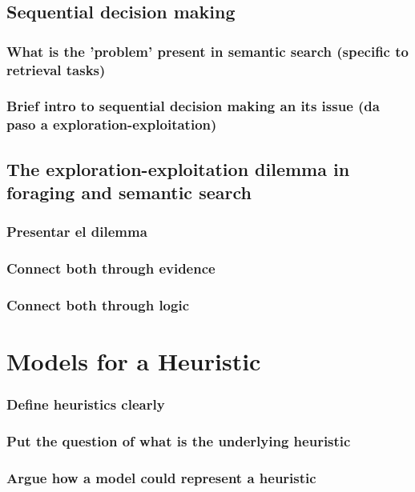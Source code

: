 \documentclass[11pt]{article}
\begin{document}
\subsection{Sequential decision making}
\label{sec:org7185ddf}
\subsubsection{What is the 'problem' present in semantic search (specific to retrieval tasks)}
\label{sec:org7029d48}
\subsubsection{Brief intro to sequential decision making an its issue (da paso a exploration-exploitation)}
\label{sec:orgdc55109}
\subsection{The exploration-exploitation dilemma in foraging and semantic search}
\label{sec:org626560d}
\subsubsection{Presentar el dilemma}
\label{sec:org3eb5538}
\subsubsection{Connect both through evidence}
\label{sec:org0b316dd}
\subsubsection{Connect both through logic}
\label{sec:org8498970}
\newpage
\section{Models for a Heuristic}
\label{sec:org8044340}
\subsubsection{Define heuristics clearly}
\label{sec:org8b1ed37}
\subsubsection{Put the question of what is the underlying heuristic}
\label{sec:org3196b27}
\subsubsection{Argue how a model could represent a heuristic}
\label{sec:org8db3261}
\end{document}
